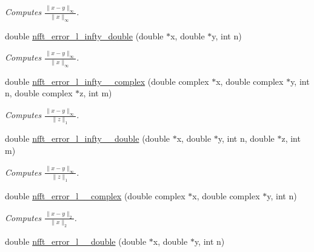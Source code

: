 \begin{CompactItemize}
\begin{CompactList}\small\item\em Computes $\frac{\|x-y\|_{\infty}}{\|x\|_{\infty}} $. \item\end{CompactList}\item 
\hypertarget{group__nfftutil_ga38}{
double \hyperlink{group__nfftutil_ga38}{nfft\_\-error\_\-l\_\-infty\_\-double} (double $\ast$x, double $\ast$y, int n)}
\label{group__nfftutil_ga38}

\begin{CompactList}\small\item\em Computes $\frac{\|x-y\|_{\infty}}{\|x\|_{\infty}} $. \item\end{CompactList}\item 
\hypertarget{group__nfftutil_ga39}{
double \hyperlink{group__nfftutil_ga39}{nfft\_\-error\_\-l\_\-infty\_\_\-complex} (double complex $\ast$x, double complex $\ast$y, int n, double complex $\ast$z, int m)}
\label{group__nfftutil_ga39}

\begin{CompactList}\small\item\em Computes $\frac{\|x-y\|_{\infty}}{\|z\|_1} $. \item\end{CompactList}\item 
\hypertarget{group__nfftutil_ga40}{
double \hyperlink{group__nfftutil_ga40}{nfft\_\-error\_\-l\_\-infty\_\_\-double} (double $\ast$x, double $\ast$y, int n, double $\ast$z, int m)}
\label{group__nfftutil_ga40}

\begin{CompactList}\small\item\em Computes $\frac{\|x-y\|_{\infty}}{\|z\|_1} $. \item\end{CompactList}\item 
\hypertarget{group__nfftutil_ga41}{
double \hyperlink{group__nfftutil_ga41}{nfft\_\-error\_\-l\_\_\-complex} (double complex $\ast$x, double complex $\ast$y, int n)}
\label{group__nfftutil_ga41}

\begin{CompactList}\small\item\em Computes $\frac{\|x-y\|_2}{\|x\|_2} $. \item\end{CompactList}\item 
\hypertarget{group__nfftutil_ga42}{
double \hyperlink{group__nfftutil_ga42}{nfft\_\-error\_\-l\_\_\-double} (double $\ast$x, double $\ast$y, int n)}
\label{group__nfftutil_ga42}


\end{CompactItemize}
